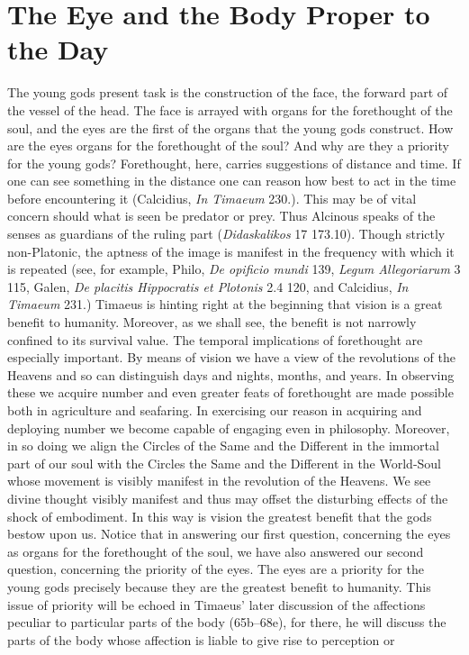 

\section{The Eye and the Body Proper to the Day} %
\label{sec:the_eye_and_the_body_proper_to_the_day}

The young gods present task is the construction of the face, the forward part of the vessel of the head. The face is arrayed with organs for the forethought of the soul, and the eyes are the first of the organs that the young gods construct. How are the eyes organs for the forethought of the soul? And why are they a priority for the young gods? Forethought, here, carries suggestions of distance and time. If one can see something in the distance one can reason how best to act in the time before encountering it (Calcidius, \emph{In Timaeum} 230.). This may be of vital concern should what is seen be predator or prey. Thus Alcinous speaks of the senses as guardians of the ruling part (\emph{Didaskalikos} 17 173.10). Though strictly non-Platonic, the aptness of the image is manifest in the frequency with which it is repeated (see, for example, Philo, \emph{De opificio mundi} 139, \emph{Legum Allegoriarum} 3 115, Galen, \emph{De placitis Hippocratis et Plotonis} 2.4 120, and Calcidius, \emph{In Timaeum} 231.) Timaeus is hinting right at the beginning that vision is a great benefit to humanity. Moreover, as we shall see, the benefit is not narrowly confined to its survival value. The temporal implications of forethought are especially important. By means of vision we have a view of the revolutions of the Heavens and so can distinguish days and nights, months, and years. In observing these we acquire number and even greater feats of forethought are made possible both in agriculture and seafaring. In exercising our reason in acquiring and deploying number we become capable of engaging even in philosophy. Moreover, in so doing we align the Circles of the Same and the Different in the immortal part of our soul with the Circles the Same and the Different in the World-Soul whose movement is visibly manifest in the revolution of the Heavens. We see divine thought visibly manifest and thus may offset the disturbing effects of the shock of embodiment. In this way is vision the greatest benefit that the gods bestow upon us. Notice that in answering our first question, concerning the eyes as organs for the forethought of the soul, we have also answered our second question, concerning the priority of the eyes. The eyes are a priority for the young gods precisely because they are the greatest benefit to humanity. This issue of priority will be echoed in Timaeus' later discussion of the affections peculiar to particular parts of the body (65b–68e), for there, he will discuss the parts of the body whose affection is liable to give rise to perception or 